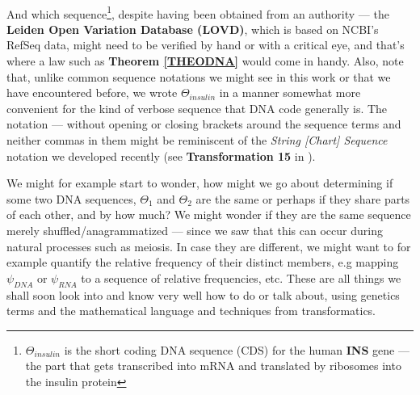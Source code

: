 \documentclass[a4paper, 18pt]{article} %
\begin{document}
\\

And which sequence\footnote{$\Theta_{insulin}$ is the short coding DNA sequence (CDS) for the human \textbf{INS} gene --- the part that gets transcribed into mRNA and translated by ribosomes into the insulin protein\cite{copilot_dna_assistant}}, despite having been obtained from an authority --- the \textbf{Leiden Open Variation Database (LOVD)}, which is based on NCBI's RefSeq data\cite{RefSeq}, might need to be verified by hand or with a critical eye, and that's where a law such as \textbf{Theorem \ref{THEODNA}} would come in handy. Also, note that, unlike common sequence notations we might see in this work or that we have encountered before, we wrote $\Theta_{insulin}$ in a manner somewhat more convenient for the kind of verbose sequence that DNA code generally is. The notation --- without opening or closing brackets around the sequence terms and neither commas in them might be reminiscent of the \textit{String [Chart] Sequence} notation we developed recently (see \textbf{Transformation 15} in \cite{transformatics}).

We might for example start to wonder, how might we go about determining if some two DNA sequences, $\Theta_1$ and $\Theta_2$ are the same or perhaps if they share parts of each other, and by how much? We might wonder if they are the same sequence merely shuffled/anagrammatized --- since we saw that this can occur during natural processes such as meiosis\cite{genomics2025origin}. In case they are different, we might want to for example quantify the relative frequency of their distinct members, e.g mapping $\psi_{DNA}$ or $\psi_{RNA}$ to a sequence of relative frequencies, etc. These are all things we shall soon look into and know very well how to do or talk about, using genetics terms and the mathematical language and techniques from transformatics.
\end{document}
